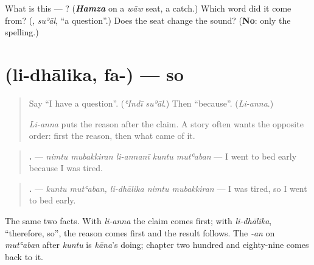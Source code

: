 \begin{tcolorbox}[breakable,colback=teal!4,colframe=teal!35!black,title={Before you move on}]
What is this — ? (\emph{\textbf{Hamza}} on a \emph{wāw} seat, a catch.) Which word did it come from? (\textbf{}, \emph{suʾāl}, \textquotedblleft{}a question\textquotedblright{}.) Does the seat change the sound? (\textbf{No}: only the spelling.)
\end{tcolorbox}
\section[\texorpdfstring{\ar{لذلك،} \ar{فـ} (li-dhālika, fa-)}{لذلك، فـ (li-dhālika, fa-)}]{  (li-dhālika, fa-) — so}

\label{lesson:AR-C285-li-dhalika-fa}



\begin{quote}
Say \textquotedblleft{}I have a question\textquotedblright{}. (\emph{ʿIndī suʾāl}.) Then \textquotedblleft{}because\textquotedblright{}. (\emph{Li-anna}.)

\emph{Li-anna} puts the reason after the claim. A story often wants the opposite order: first the reason, then what came of it.
\end{quote}

\begin{grammarlens}[title={Grammar Lens: li-dhālika, after the reason}]
\begin{quote}
\textbf{    .} — \emph{nimtu mubakkiran li-annanī kuntu mutʿaban} — I went to bed early because I was tired.
\end{quote}

\begin{quote}
\textbf{    .} — \emph{kuntu mutʿaban, li-dhālika nimtu mubakkiran} — I was tired, so I went to bed early.
\end{quote}

The same two facts. With \emph{li-anna} the claim comes first; with \emph{li-dhālika}, \textquotedblleft{}therefore, so\textquotedblright{}, the reason comes first and the result follows. The \emph{-an} on \emph{mutʿaban} after \emph{kuntu} is \emph{kāna}'s doing; chapter two hundred and eighty-nine comes back to it.
\end{grammarlens}

